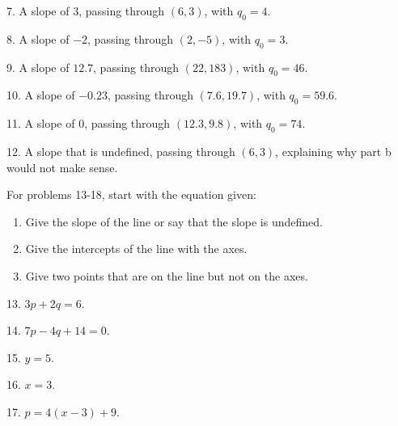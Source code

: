 \documentclass[10pt,]{book}
\theoremstyle{plain}
\theoremstyle{definition}
\theoremstyle{definition}
\begin{document}
\begin{exerciselist}
\begin{enumerate}[label=(\alph*)]
\end{enumerate}
\item[7.]\hypertarget{exercise-7}{} A slope of \(3\), passing through \((6,3)\), with \(q_0=4\).
%
\par\smallskip
\item[8.]\hypertarget{exercise-8}{} A slope of \(-2\), passing through \((2,-5)\), with \(q_0=3\).
%
\par\smallskip
\item[9.]\hypertarget{exercise-9}{} A slope of \(12.7\), passing through \((22,183)\), with \(q_0=46\).
%
\par\smallskip
\item[10.]\hypertarget{exercise-10}{} A slope of \(-0.23\), passing through \((7.6,19.7)\), with \(q_0=59.6\).
%
\par\smallskip
\item[11.]\hypertarget{exercise-11}{} A slope of 0, passing through \((12.3,9.8)\), with \(q_0=74\).
%
\par\smallskip
\item[12.]\hypertarget{exercise-12}{} A slope that is undefined, passing through \((6,3)\), explaining why part b would not make sense.
%
\par\smallskip
\par
For problems 13-18, start with the equation given:%
\leavevmode%
\begin{enumerate}[label=(\alph*)]
\item\hypertarget{li-40}{}Give the slope of the line or say that the slope is undefined.%
\item\hypertarget{li-41}{}Give the intercepts of the line with the axes.%
\item\hypertarget{li-42}{}Give two points that are on the line but not on the axes.%
\end{enumerate}
\item[13.]\hypertarget{exercise-13}{} \(3 p+2 q=6\).
%
\par\smallskip
\item[14.]\hypertarget{exercise-14}{} \(7 p-4 q+14=0\).
%
\par\smallskip
\item[15.]\hypertarget{exercise-15}{} \(y=5\).
%
\par\smallskip
\item[16.]\hypertarget{exercise-16}{} \(x=3\).
%
\par\smallskip
\item[17.]\hypertarget{exercise-17}{}
 \(p=4(x-3)+9\).
%
\par\smallskip

\end{exerciselist}
\end{document}
